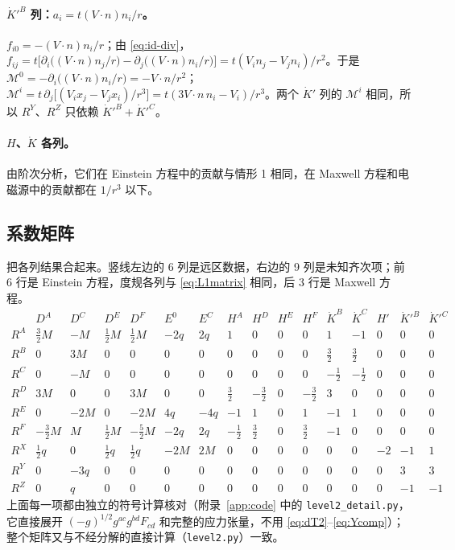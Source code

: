 \documentclass[11pt,a4paper]{ctexart}
\numberwithin{equation}{section}
\begin{document}
\paragraph{$\dot K'^B$ 列：$a_i=t(V\!\cdot n)n_i/r$。}$f_{i0}=-(V\!\cdot n)n_i/r$；由 \eqref{eq:id-div}，$f_{ij}=t\big[\partial_i\big((V\!\cdot n)n_j/r\big)-\partial_j\big((V\!\cdot n)n_i/r\big)\big]=t(V_in_j-V_jn_i)/r^2$。于是 $\mathcal M^0=-\partial_i\big((V\!\cdot n)n_i/r\big)=-V\!\cdot n/r^2$；$\mathcal M^i=t\,\partial_j\big[(V_ix_j-V_jx_i)/r^3\big]=t(3V\!\cdot n\,n_i-V_i)/r^3$。两个 $\dot K'$ 列的 $\mathcal M^i$ 相同，所以 $R^Y$、$R^Z$ 只依赖 $\dot K'^B+\dot K'^C$。

\paragraph{$H$、$\dot K$ 各列。}由阶次分析，它们在 Einstein 方程中的贡献与情形 1 相同，在 Maxwell 方程和电磁源中的贡献都在 $1/r^3$ 以下。

\subsection{系数矩阵}

把各列结果合起来。竖线左边的 6 列是远区数据，右边的 9 列是未知齐次项；前 6 行是 Einstein 方程，度规各列与 \eqref{eq:L1matrix} 相同，后 3 行是 Maxwell 方程。
{\small\setlength{\arraycolsep}{3pt}
\begin{equation}
\begin{array}{c|rrrrrr|rrrrrrrrr}
 & D^A & D^C & D^E & D^F & E^0 & E^C & H^A & H^D & H^E & H^F & \dot K^B & \dot K^C & H' & \dot K'^B & \dot K'^C\\\hline
R^A & \tfrac32M & -M & \tfrac12M & \tfrac12M & -2q & 2q & 1&0&0&0&1&-1&0&0&0\\
R^B & 0 & 3M & 0&0&0&0& 0&0&0&0&\tfrac32&\tfrac32&0&0&0\\
R^C & 0 & -M & 0&0&0&0& 0&0&0&0&-\tfrac12&-\tfrac12&0&0&0\\
R^D & 3M & 0 & 0 & 3M &0&0& \tfrac32&-\tfrac32&0&-\tfrac32&3&0&0&0&0\\
R^E & 0 & -2M & 0 & -2M & 4q & -4q & -1&1&0&1&-1&1&0&0&0\\
R^F & -\tfrac32M & M & \tfrac12M & -\tfrac52M & -2q & 2q & -\tfrac12&\tfrac32&0&\tfrac32&-1&0&0&0&0\\\hline
R^X & \tfrac12q & 0 & \tfrac12q & \tfrac12q & -2M & 2M & 0&0&0&0&0&0&-2&-1&1\\
R^Y & 0 & -3q & 0&0&0&0& 0&0&0&0&0&0&0&3&3\\
R^Z & 0 & q & 0&0&0&0& 0&0&0&0&0&0&0&-1&-1
\end{array}
\label{eq:L2matrix}
\end{equation}}
上面每一项都由独立的符号计算核对（附录~\ref{app:code} 中的 \texttt{level2\_detail.py}，它直接展开 $(-g)^{1/2}g^{ac}g^{bd}F_{cd}$ 和完整的应力张量，不用 \eqref{eq:dT2}--\eqref{eq:Ycomp}）；整个矩阵又与不经分解的直接计算（\texttt{level2.py}）一致。
\end{document}
